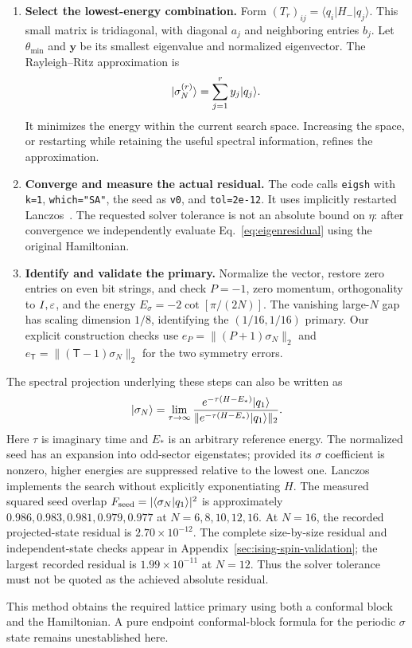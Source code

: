 \begin{enumerate}
\item \textbf{Select the lowest-energy combination.}
Form $(T_r)_{ij}=\langle q_i|H_-|q_j\rangle$. This small matrix is
tridiagonal, with diagonal $a_j$ and neighboring entries $b_j$.
Let $\theta_{\min}$ and $\bm y$ be its smallest eigenvalue and normalized
eigenvector. The Rayleigh--Ritz approximation is
\begin{equation}
 \lvert \sigma_N^{(r)}\rangle=\sum_{j=1}^r y_j\lvert q_j\rangle.
\end{equation}
It minimizes the energy within the current search space. Increasing the
space, or restarting while retaining the useful spectral information,
refines the approximation.
\item \textbf{Converge and measure the actual residual.}
The code calls \texttt{eigsh} with \texttt{k=1}, \texttt{which="SA"},
the seed as \texttt{v0}, and \texttt{tol=2e-12}. It uses implicitly
restarted Lanczos~\cite{ScipyEigsh}. The requested solver tolerance is
not an absolute bound on $\eta$: after convergence we independently
evaluate Eq.~\eqref{eq:eigenresidual} using the original Hamiltonian.
\item \textbf{Identify and validate the primary.}
Normalize the vector, restore zero entries on even bit strings, and
check $P=-1$, zero momentum, orthogonality to $I,\varepsilon$, and the energy
$E_\sigma=-2\cot[\pi/(2N)]$. The vanishing large-$N$ gap has scaling
dimension $1/8$, identifying the $(1/16,1/16)$ primary.
Our explicit construction checks use
$e_P=\|(P+1)\sigma_N\|_2$ and
$e_{\mathsf T}=\|(\mathsf T-1)\sigma_N\|_2$ for the two symmetry errors.
\end{enumerate}

The spectral projection underlying these steps can also be written as
\begin{equation}
 \lvert \sigma_N\rangle=\lim_{\tau\to\infty}
 \frac{e^{-\tau(H-E_*)}\lvert q_1\rangle}
 {\|e^{-\tau(H-E_*)}\lvert q_1\rangle\|_2}.
 \label{eq:projection}
\end{equation}
Here $\tau$ is imaginary time and $E_*$ is an arbitrary reference energy.
The normalized seed has an expansion into odd-sector eigenstates;
provided its $\sigma$ coefficient is nonzero, higher energies are
suppressed relative to the lowest one. Lanczos implements the search
without explicitly exponentiating $H$.
The measured squared seed overlap
$F_{\rm seed}=|\langle\sigma_N|q_1\rangle|^2$ is approximately
$0.986,0.983,0.981,0.979,0.977$ at $N=6,8,10,12,16$.
At $N=16$, the recorded projected-state residual is
$2.70\times10^{-12}$.
The complete size-by-size residual and independent-state checks appear
in Appendix~\ref{sec:ising-spin-validation}; the largest recorded residual is
$1.99\times10^{-11}$ at $N=12$. Thus the solver tolerance must not be
quoted as the achieved absolute residual.

This method obtains the required lattice primary using both a conformal
block and the Hamiltonian. A pure endpoint conformal-block formula for
the periodic $\sigma$ state remains unestablished here.
